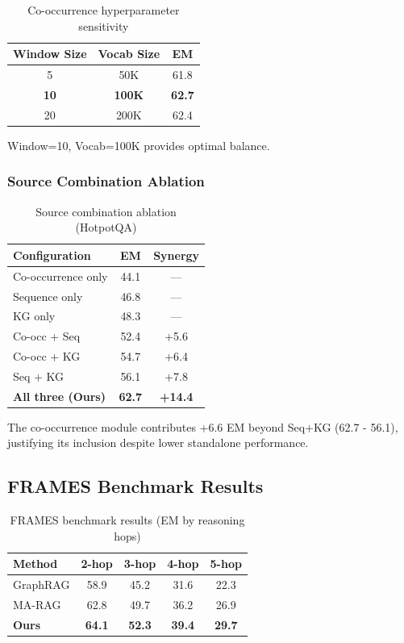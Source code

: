 \documentclass[10pt,twocolumn]{article}
\begin{document}
\begin{table}[h]
\centering
\caption{Co-occurrence hyperparameter sensitivity}
\label{tab:cooc_sensitivity}
\small
\begin{tabular}{@{}ccc@{}}
\toprule
\textbf{Window Size} & \textbf{Vocab Size} & \textbf{EM} \\
\midrule
5 & 50K & 61.8 \\
\textbf{10} & \textbf{100K} & \textbf{62.7} \\
20 & 200K & 62.4 \\
\bottomrule
\end{tabular}
\end{table}

Window=10, Vocab=100K provides optimal balance.


\subsubsection{Source Combination Ablation}

\begin{table}[h]
\centering
\caption{Source combination ablation (HotpotQA)}
\label{tab:source_ablation}
\small
\begin{tabular}{@{}lcc@{}}
\toprule
\textbf{Configuration} & \textbf{EM} & \textbf{Synergy} \\
\midrule
Co-occurrence only & 44.1 & --- \\
Sequence only & 46.8 & --- \\
KG only & 48.3 & --- \\
\midrule
Co-occ + Seq & 52.4 & +5.6 \\
Co-occ + KG & 54.7 & +6.4 \\
Seq + KG & 56.1 & +7.8 \\
\midrule
\textbf{All three (Ours)} & \textbf{62.7} & \textbf{+14.4} \\
\bottomrule
\end{tabular}
\end{table}

The co-occurrence module contributes +6.6 EM beyond Seq+KG (62.7 - 56.1), justifying its inclusion despite lower standalone performance.


\subsection{FRAMES Benchmark Results}
\label{sec:frames}

\begin{table}[h]
\centering
\caption{FRAMES benchmark results (EM by reasoning hops)}
\label{tab:frames}
\small
\begin{tabular}{@{}lcccc@{}}
\toprule
\textbf{Method} & \textbf{2-hop} & \textbf{3-hop} & \textbf{4-hop} & \textbf{5-hop} \\
\midrule
GraphRAG & 58.9 & 45.2 & 31.6 & 22.3 \\
MA-RAG & 62.8 & 49.7 & 36.2 & 26.9 \\
\midrule
\textbf{Ours} & \textbf{64.1} & \textbf{52.3} & \textbf{39.4} & \textbf{29.7} \\
\bottomrule
\end{tabular}
\end{table}
\end{document}
